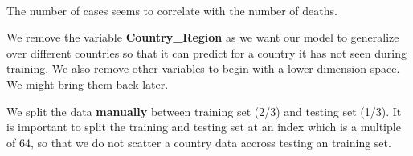 \documentclass[11pt]{article}
\begin{document}
    \begin{center}
    \end{center}
    { \hspace*{\fill} \\}
    
    The number of cases seems to correlate with the number of deaths.

    We remove the variable \textbf{Country\_Region} as we want our model to
generalize over different countries so that it can predict for a country
it has not seen during training. We also remove other variables to begin
with a lower dimension space. We might bring them back later.

We split the data \textbf{manually} between training set (2/3) and
testing set (1/3). It is important to split the training and testing set
at an index which is a multiple of 64, so that we do not scatter a
country data accross testing an training set.
\end{document}
